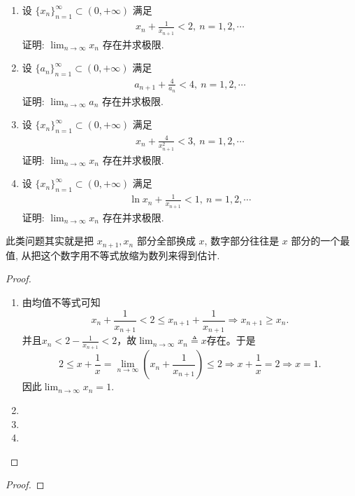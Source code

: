 \documentclass[../../main.tex]{subfiles}
\begin{document}
\begin{example}
\begin{enumerate}
\item 设 $\{x_n\}_{n=1}^{\infty} \subset (0,+\infty)$ 满足
\begin{align*}
x_n + \frac{1}{x_{n+1}} < 2,\ n = 1,2,\cdots
\end{align*}
证明: $\lim_{n \to \infty} x_n$ 存在并求极限.
\item 设 $\{a_n\}_{n=1}^{\infty} \subset (0,+\infty)$ 满足
\begin{align*}
a_{n+1} + \frac{4}{a_n} < 4,\ n = 1,2,\cdots
\end{align*}
证明: $\lim_{n \to \infty} a_n$ 存在并求极限.
\item 设 $\{x_n\}_{n=1}^{\infty} \subset (0,+\infty)$ 满足
\begin{align*}
x_n + \frac{4}{x_{n+1}^2} < 3,\ n = 1,2,\cdots
\end{align*}
证明: $\lim_{n \to \infty} x_n$ 存在并求极限.
\item 设 $\{x_n\}_{n=1}^{\infty} \subset (0,+\infty)$ 满足
\begin{align*}
\ln x_n + \frac{1}{x_{n+1}} < 1,\ n = 1,2,\cdots
\end{align*}
证明: $\lim_{n \to \infty} x_n$ 存在并求极限.
\end{enumerate}
\end{example}
\begin{note}
此类问题其实就是把 $x_{n+1}, x_n$ 部分全部换成 $x$, 数字部分往往是 $x$ 部分的一个最值, 从把这个数字用不等式放缩为数列来得到估计.
\end{note}
\begin{proof}
\begin{enumerate}
\item 由均值不等式可知
$$x_n + \frac{1}{x_{n+1}} < 2 \leqslant x_{n+1} + \frac{1}{x_{n+1}} \Rightarrow x_{n+1} \geqslant x_n.$$
并且$x_n < 2 - \frac{1}{x_{n+1}} < 2$，故$\lim_{n \to \infty} x_n \triangleq x$存在。于是
$$2 \leqslant x + \frac{1}{x} = \lim_{n \to \infty} \left( x_n + \frac{1}{x_{n+1}} \right) \leqslant 2 \Rightarrow x + \frac{1}{x} = 2 \Rightarrow x = 1.$$
因此$\lim_{n \to \infty} x_n = 1.$

\item 

\item 

\item 
\end{enumerate}
\end{proof}

\begin{example}

\end{example}
\begin{proof}

\end{proof}
\end{document}
